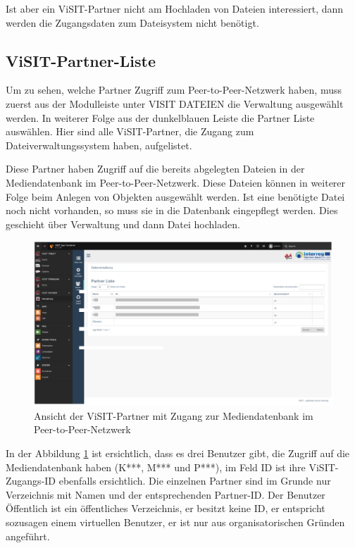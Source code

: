 Ist aber ein ViSIT-Partner nicht am Hochladen von Dateien interessiert, dann werden die Zugangsdaten zum Dateisystem nicht benötigt.

\subsection{ViSIT-Partner-Liste}

Um zu sehen, welche Partner Zugriff zum Peer-to-Peer-Netzwerk haben, muss zuerst aus der Modulleiste unter VISIT DATEIEN die Verwaltung ausgewählt werden. In weiterer Folge  aus der dunkelblauen Leiste die Partner Liste auswählen. Hier sind alle ViSIT-Partner, die Zugang zum Dateiverwaltungssystem haben, aufgelistet.

Diese Partner haben Zugriff auf die bereits abgelegten Dateien in der Mediendatenbank im Peer-to-Peer-Netzwerk. Diese Dateien können in weiterer Folge beim Anlegen von Objekten ausgewählt werden. Ist eine benötigte Datei noch nicht vorhanden, so muss sie in die Datenbank eingepflegt werden. Dies geschieht über Verwaltung und dann Datei hochladen.\\

\begin{figure}[ht!]
\centering
\includegraphics[width=12cm]{Figures/paula/dateiverwaltung/visit_partner.png}
\caption{Ansicht der ViSIT-Partner mit Zugang zur Mediendatenbank im Peer-to-Peer-Netzwerk}
\label{img:visit_partner}
\end{figure}

In der Abbildung \ref{img:visit_partner} ist ersichtlich, dass es drei Benutzer gibt, die Zugriff auf die Mediendatenbank haben (K***, M*** und P***), im Feld ID ist ihre ViSIT-Zugangs-ID ebenfalls ersichtlich. Die einzelnen Partner sind im Grunde nur Verzeichnis mit Namen und der entsprechenden Partner-ID. Der Benutzer Öffentlich ist ein öffentliches Verzeichnis, er besitzt keine ID, er entspricht sozusagen einem virtuellen Benutzer, er ist nur aus organisatorischen Gründen angeführt.

